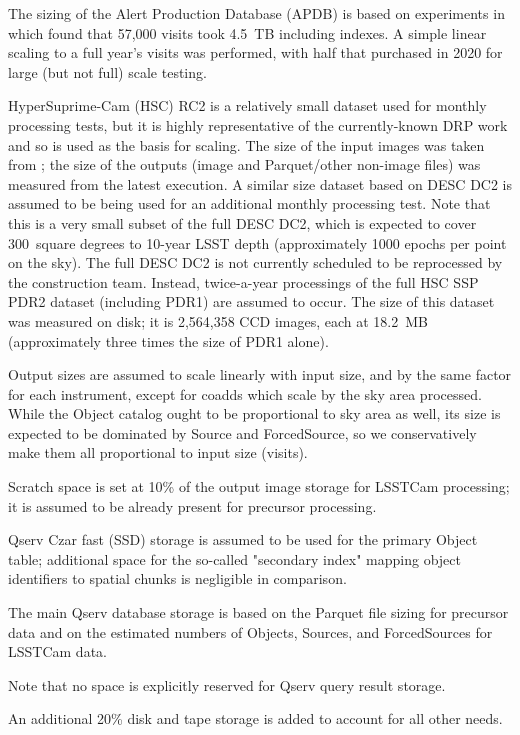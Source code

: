 The sizing of the Alert Production Database (APDB) is based on experiments in \cite{DMTN-113} which found that 57,000 visits took 4.5~TB including indexes.
A simple linear scaling to a full year's visits was performed, with half that purchased in 2020 for large (but not full) scale testing.

HyperSuprime-Cam (HSC) RC2 is a relatively small dataset used for monthly processing tests, but it is highly representative of the currently-known DRP work and so is used as the basis for scaling.
The size of the input images was taken from \cite{DMTN-091}; the size of the outputs (image and Parquet/other non-image files) was measured from the latest execution.
A similar size dataset based on DESC DC2 is assumed to be being used for an additional monthly processing test.
Note that this is a very small subset of the full DESC DC2, which is expected to cover 300~square degrees to 10-year LSST depth (approximately 1000 epochs per point on the sky).
The full DESC DC2 is not currently scheduled to be reprocessed by the construction team.
Instead, twice-a-year processings of the full HSC SSP PDR2 dataset (including PDR1) are assumed to occur.
The size of this dataset was measured on disk; it is 2,564,358 CCD images, each at 18.2~MB (approximately three times the size of PDR1 alone).

Output sizes are assumed to scale linearly with input size, and by the same factor for each instrument, except for coadds which scale by the sky area processed.
While the Object catalog ought to be proportional to sky area as well, its size is expected to be dominated by Source and ForcedSource, so we conservatively make them all proportional to input size (visits).

Scratch space is set at 10\% of the output image storage for LSSTCam processing; it is assumed to be already present for precursor processing.

Qserv Czar fast (SSD) storage is assumed to be used for the primary Object table; additional space for the so-called "secondary index" mapping object identifiers to spatial chunks is negligible in comparison.

The main Qserv database storage is based on the Parquet file sizing for precursor data and on the estimated numbers of Objects, Sources, and ForcedSources for LSSTCam data.

Note that no space is explicitly reserved for Qserv query result storage.

An additional 20\% disk and tape storage is added to account for all other needs.

